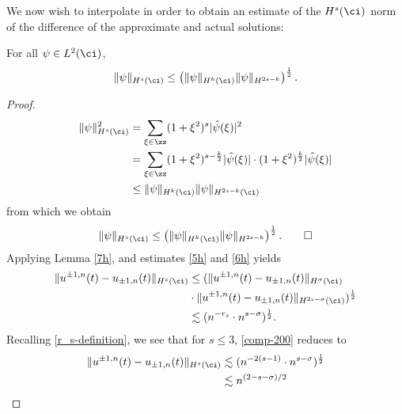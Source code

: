 		We now wish to interpolate in order to obtain an estimate of the $H^s (\ci)$
		norm of the difference of the approximate and actual solutions:
		\begin{lemma}
			\label{7h}
			For all $\psi \in L^2(\ci)$,
			\begin{equation*}
				\|\psi \|_{H^s (\ci)} \leq \left( \| \psi \|_{H^k (\ci)} \| \psi
				\|_{H^{2s - k}} \right)^{\frac{1}{2}}.
			\end{equation*}
		\end{lemma}
		\begin{proof}
			\begin{equation*}
				\begin{split}
					\|\psi\|^2_{H^s (\ci)} & = \sum_{\xi \in \zz} (1 + 
					\xi^2)^s |\hat{\psi}(\xi) |^2
				\\
				& = \sum_{\xi \in \zz} (1 + \xi^2)^{s - 
				\frac{k}{2}}|\hat{\psi}(\xi)| \cdot
				( 1 + \xi^2)^{\frac{k}{2}}|\hat{\psi}(\xi)|
				\\
				& \le \|\psi\|_{H^k(\ci)}
				\|\psi\|_{H^{2s - k}(\ci)}
			\end{split}
			\end{equation*}
			from which we obtain 
		\begin{equation*}
				\|\psi \|_{H^s (\ci)} \leq \left( \| \psi \|_{H^k (\ci)} \| \psi
				\|_{H^{2s - k}} \right)^{\frac{1}{2}}. \qquad \Box
			\end{equation*}
			Applying Lemma \ref{7h}, and estimates \eqref{5h} and \eqref{6h}
			yields
			\begin{equation}
				\label{comp-200}
				\begin{split}
					\|u^{\pm 1,n}(t) - u_{\pm 1, n}(t) \|_{H^s (\ci)}
					& \le ( \| u^{\pm 1,n}(t)
					- u_{\pm 1, n}(t) \|_{H^\sigma (\ci)}
					\\
					& \cdot \| u^{\pm 1,n}(t)
					- u_{\pm 1, n}(t)\|_{H^{2s - \sigma}(\ci)} )^{\frac{1}{2}}
					\\
					& \lesssim (n^{-r_s} \cdot n^{s-\sigma})^{\frac{1}{2}}.
				\end{split}
			\end{equation}
			Recalling \eqref{r_s-definition}, we see that for $s \le 3$,
			\eqref{comp-200} reduces to 
			\begin{equation}
				\begin{split}
					\|u^{\pm 1,n}(t) - u_{\pm 1, n}(t) \|_{H^s (\ci)}
					& \lesssim (n^{-2(s-1)} \cdot n^{s-\sigma})^{\frac{1}{2}}
					\\
					& \lesssim n^{(2-s - \sigma)/2}
					\label{8h}

\end{split}
\end{equation}
\end{proof}
